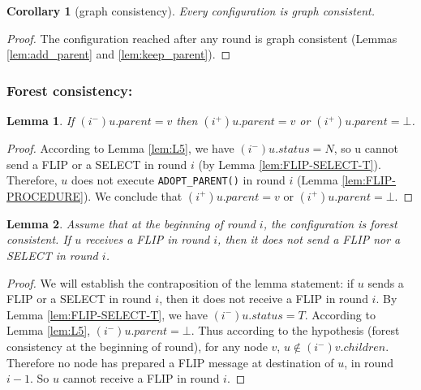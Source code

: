 \documentclass[twocolumn]{article}
\newtheorem{lemma}{Lemma}
\newtheorem{corollary}{Corollary}
\newcommand{\depends}[1]{}
\newcommand{\state}[3]{\ensuremath{(#2^{#3})#1}}
\newcommand{\uim}{\state{u}{i}{-}}
\newcommand{\vim}{\state{v}{i}{-}}
\newcommand{\uip}{\state{u}{i}{+}}
\begin{document}
\begin{corollary}[graph consistency]
\label{co:consistency}
Every configuration is graph consistent.
\end{corollary}
\begin{proof}
The configuration reached after any round is graph consistent
(Lemmas \ref{lem:add_parent} and \ref{lem:keep_parent}).
 \end{proof}

\subsubsection{Forest consistency:}


\begin{lemma}
\label{lem:N-parent}
If $\uim.parent=v$ then $\uip.parent=v$ or $\uip.parent=\bot$.
\depends{ }
\end{lemma}

\begin{proof}
According to Lemma \ref{lem:L5}, we have $\uim.status=N$, so 
u cannot send a  FLIP or a SELECT in round $i$ (by Lemma \ref{lem:FLIP-SELECT-T}).
Therefore, $u$ does not execute \texttt{ADOPT\_PARENT()} in round $i$ 
(Lemma \ref{lem:FLIP-PROCEDURE}). We conclude that 
$\uip.parent=v$ or $\uip.parent=\bot$.
 \end{proof}




\begin{lemma}
\label{lem:cond-2FLIPs}
Assume that at the beginning of round $i$, the configuration is forest consistent. If $u$ receives a FLIP in round $i$, then it does not send a FLIP nor a SELECT in round $i$.
\depends{\ref{th:consistency},  \ref{lem:FLIP-SELECT-T}, \ref{lem:L5}}
\end{lemma}


\begin{proof}
We will establish the contraposition of the lemma statement: 
if $u$ sends a FLIP or a SELECT in round $i$, then it does not receive a FLIP in round $i$.
By Lemma \ref{lem:FLIP-SELECT-T}, we have $\uim.status=T$.
According to Lemma \ref{lem:L5}, $\uim.parent=\bot$.
Thus according to the hypothesis (forest consistency at the beginning of round), for any node $v$, $u \notin \vim.children$.
Therefore no node has prepared a FLIP message at destination of $u$, 
in round $i-1$.
So $u$ cannot receive a FLIP in round $i$.
 \end{proof}
\end{document}
